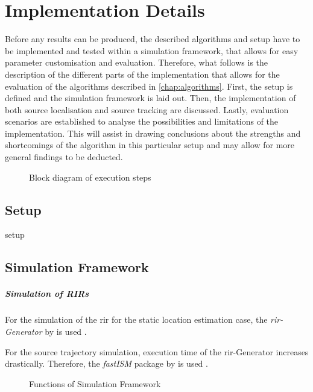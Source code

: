 \chapter{Implementation Details}
\label{chap:implementation}
Before any results can be produced, the described algorithms and setup have to be implemented and tested within a simulation framework, that allows for easy parameter customisation and evaluation. Therefore, what follows is the description of the different parts of the implementation that allows for the evaluation of the algorithms described in \ref{chap:algorithms}. First, the setup is defined and the simulation framework is laid out. Then, the implementation of both source localisation and source tracking are discussed. Lastly, evaluation scenarios are established to analyse the possibilities and limitations of the implementation. This will assist in drawing conclusions about the strengths and shortcomings of the algorithm in this particular setup and may allow for more general findings to be deducted.

\begin{figure}[H]
	\centering
	
	\caption{Block diagram of execution steps}
	\label{diag:execBlocks}
\end{figure}


\section{Setup}
\label{sec:setup}
{setup}

\section{Simulation Framework}


\paragraph{Simulation of RIRs}
For the simulation of the \gls{rir} for the static location estimation case, the \emph{\gls{rir}-Generator} by \citeauthor{Habets2014} is used \cite{Habets2014}.

For the source trajectory simulation, execution time of the \gls{rir}-Generator increases drastically. Therefore, the \emph{fastISM} package by \citeauthor{Lehmann2010} is used \cite{Lehmann2010}.
\begin{figure}[H]
	\centering
	
	\caption{Functions of Simulation Framework}
	\label{diag:simulationFramework}
\end{figure}

